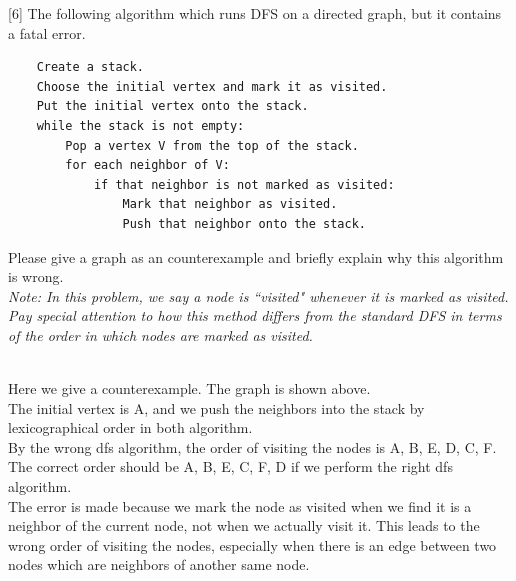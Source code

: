 \raggedright
{}[6]
The following algorithm which runs DFS on a directed graph, but it contains a fatal error.
\begin{lstlisting}
    Create a stack.
    Choose the initial vertex and mark it as visited.
    Put the initial vertex onto the stack.
    while the stack is not empty:
        Pop a vertex V from the top of the stack.
        for each neighbor of V:
            if that neighbor is not marked as visited:
                Mark that neighbor as visited.
                Push that neighbor onto the stack.
\end{lstlisting}

    
Please give a graph as an counterexample and briefly explain why this algorithm is wrong. 
\\
\textit{Note: In this problem, we say a node is ``visited" whenever it is marked as visited. Pay special attention to how this method differs from the standard DFS in terms of the order in which nodes are marked as visited.}\\


\raggedright
\begin{solution}
    \begin{center}
        \\
        \vspace{1pt}
    Here we give a counterexample. The graph is shown above. \\
    The initial vertex is A, and we push the neighbors into the stack by lexicographical order in both algorithm.\\

    By the wrong dfs algorithm, the order of visiting the nodes is A, B, E, D, C, F. 
    The correct order should be A, B, E, C, F, D if we perform the right dfs algorithm.\\
    \vspace{1pt}
    The error is made because we mark the node as visited when we find it is a neighbor of the current node, not when we actually visit it. This leads to the wrong order of visiting the nodes, especially when there is an edge between two nodes which are neighbors of another same node.
    \end{center}
\end{solution}